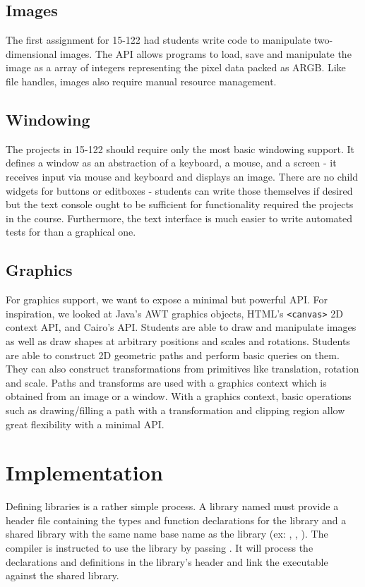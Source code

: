 \subsection{Images}

The first assignment for 15-122 had students write code to manipulate
two-dimensional images. The API allows programs to load, save and manipulate
the image as a \langname{} array of integers representing the pixel data
packed as ARGB. Like file handles, images also require manual resource
management.

\subsection{Windowing}

The projects in 15-122 should require only the most basic windowing support.  It
defines a window as an abstraction of a keyboard, a mouse, and a screen - it
receives input via mouse and keyboard and displays an image. There are no child
widgets for buttons or editboxes - students can write those themselves if
desired but the text console ought to be sufficient for functionality required
the projects in the course. Furthermore, the text interface is much easier to
write automated tests for than a graphical one.

\subsection{Graphics}

For graphics support, we want to expose a minimal but powerful API. For
inspiration, we looked at Java's AWT graphics objects, HTML's {\tt <canvas>} 2D
context API, and Cairo's API. Students are able to draw and manipulate images
as well as draw shapes at arbitrary positions and scales and rotations.
Students are able to construct 2D geometric paths and perform basic queries on
them.  They can also construct transformations from primitives like
translation, rotation and scale. Paths and transforms are used with a graphics
context which is obtained from an image or a window. With a graphics context,
basic operations such as drawing/filling a path with a transformation and
clipping region allow great flexibility with a minimal API.

\section{Implementation}

Defining libraries is a rather simple process. A library named 
must provide a header file  containing the \langname{} types
and function declarations for the library and a shared library with the same
name base name as the library (ex: ,
, ). The compiler is instructed to use
the library  by passing . It will process the
declarations and definitions in the library's header and link the executable
against the shared library.


